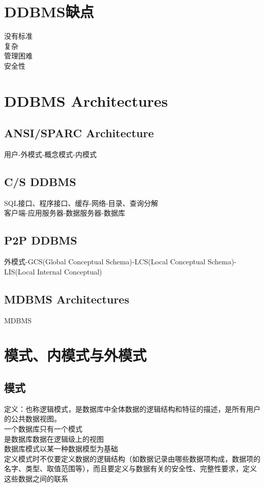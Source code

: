 \documentclass{article}
\begin{document}
\begin{CJK}{UTF8}{gbsn}
	\section*{DDBMS缺点}
	没有标准\\
	复杂\\
	管理困难\\
	安全性\\
	\section*{DDBMS Architectures}
	\subsection*{ANSI/SPARC Architecture}
	用户-外模式-概念模式-内模式\\
	\subsection*{C/S DDBMS}
	SQL接口、程序接口、缓存-网络-目录、查询分解\\
	客户端-应用服务器-数据服务器-数据库\\
	\subsection*{P2P DDBMS}
	外模式-GCS(Global Conceptual Schema)-LCS(Local Conceptual Schema)-LIS(Local Internal Conceptual)\\
	\subsection*{MDBMS Architectures}
	MDBMS
	\section*{模式、内模式与外模式}
	\subsection*{模式}
	定义：也称逻辑模式，是数据库中全体数据的逻辑结构和特征的描述，是所有用户的公共数据视图。\\
	一个数据库只有一个模式\\
	是数据库数据在逻辑级上的视图\\
	数据库模式以某一种数据模型为基础\\
	定义模式时不仅要定义数据的逻辑结构（如数据记录由哪些数据项构成，数据项的名字、类型、取值范围等），而且要定义与数据有关的安全性、完整性要求，定义这些数据之间的联系\\

\end{CJK}
\end{document}
